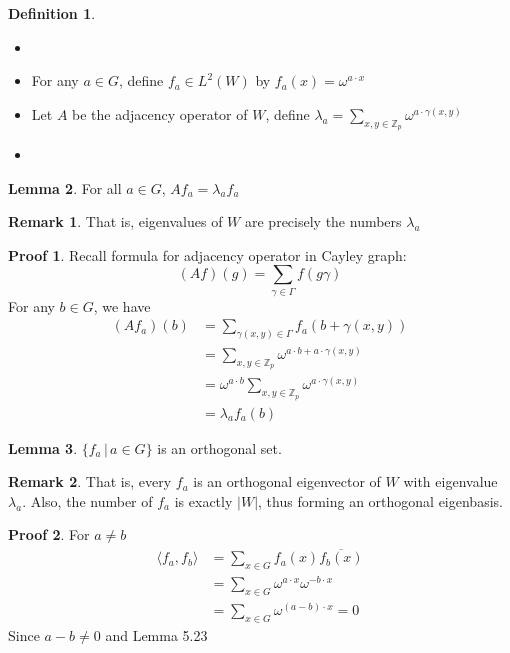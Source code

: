 \documentclass{book}
\newcommand{\Z}{\mathbb{Z}}
\newcommand{\inner}[1]{\langle #1 \rangle}
\newcommand{\abs}[1]{\lvert #1 \rvert }
\theoremstyle{definition}
\newtheorem{lemma}{Lemma}[chapter]
\newtheorem{definition}[lemma]{Definition}
\theoremstyle{remarkstyle}
\newtheorem*{remark}{Remark}%
\newtheorem*{myproof}{Proof}%
\begin{document}
\begin{definition}
\begin{itemize}
    \item[]
    \item For any $a\in G$, define $f_a\in L^2(W) $ by $f_a(x)=\omega^{a\cdot x} $
    \item Let $A$ be the adjacency operator of $W$, define $\lambda_a=\sum_{x,y\in \Z_p}\omega^{a\cdot\gamma(x,y)} $
    \item[] 
\end{itemize}
\end{definition}

\begin{lemma}
    For all $a\in G$, $Af_a=\lambda_af_a$
\end{lemma}
\begin{remark}
    That is, eigenvalues of $W$ are precisely the numbers $\lambda_a$
\end{remark}
\begin{myproof}
Recall formula for adjacency operator in Cayley graph:
$$
(Af)(g) = \sum_{\gamma\in\Gamma}f(g\gamma)
$$
    For any $b\in G$, we have 
    \begin{align*}
        (Af_a)(b) 
        &= \sum_{\gamma(x,y)\in \Gamma} f_a(b+\gamma(x,y)) \\
        &= \sum_{x,y\in\Z_p}\omega^{a\cdot b+a\cdot\gamma(x,y)} \\
        &= \omega^{a\cdot b}\sum_{x,y\in\Z_p}\omega^{a\cdot\gamma(x,y)} \\
        &= \lambda_af_a(b)
    \end{align*}
    \newline
\end{myproof}

\begin{lemma}
    $\{f_a\,\lvert\,a\in G\} $ is an orthogonal set.
\end{lemma}
\begin{remark}
    That is, every $f_a$ is an orthogonal eigenvector of $W$ with eigenvalue $\lambda_a$. Also, the number of $f_a$ is exactly $\abs{W}$, thus forming an orthogonal eigenbasis. 
\end{remark}
\begin{myproof}
    For $a\neq b$
    \begin{align*}
        \inner{f_a,f_b} &= \sum_{x\in G}f_a(x)\overline{f_b(x)} \\
        &= \sum_{x\in G}\omega^{a\cdot x}\omega^{-b\cdot x} \\
        &= \sum_{x\in G}\omega^{(a-b)\cdot x} = 0
    \end{align*}
    Since $a-b\neq 0$ and Lemma 5.23 \newline
\end{myproof}
\end{document}
